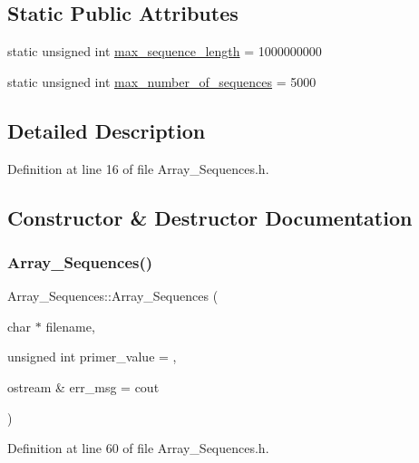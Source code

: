 \subsection*{Static Public Attributes}
\begin{DoxyCompactItemize}
\item 
static unsigned int \mbox{\hyperlink{class_array___sequences_a05103713b20762f7e2a4a970a35514f2}{max\+\_\+sequence\+\_\+length}} = 1000000000
\item 
static unsigned int \mbox{\hyperlink{class_array___sequences_a15164d8882eac2d8cf368f74fde967d2}{max\+\_\+number\+\_\+of\+\_\+sequences}} = 5000
\end{DoxyCompactItemize}


\subsection{Detailed Description}


Definition at line 16 of file Array\+\_\+\+Sequences.\+h.



\subsection{Constructor \& Destructor Documentation}
\mbox{\label{class_array___sequences_a4960de248d6dceefcae88e66a5a51e8b}} 
\subsubsection{\texorpdfstring{Array\+\_\+\+Sequences()}{Array\_Sequences()}\hspace{0.1cm}{\footnotesize\ttfamily [1/2]}}
{\footnotesize\ttfamily Array\+\_\+\+Sequences\+::\+Array\+\_\+\+Sequences (\begin{DoxyParamCaption}\item[{char $\ast$}]{filename,  }\item[{unsigned int}]{primer\+\_\+value = {},  }\item[{ostream \&}]{err\+\_\+msg = {\ttfamily cout} }\end{DoxyParamCaption})}



Definition at line 60 of file Array\+\_\+\+Sequences.\+h.

